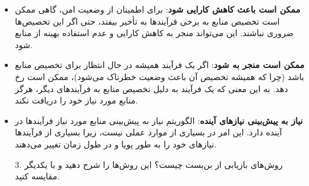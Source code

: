 \begin{qsolve}
\begin{enumerate}
\begin{itemize}
			\item \textbf{ممکن است باعث کاهش کارایی شود}: برای اطمینان از وضعیت امن، گاهی ممکن است تخصیص منابع به برخی فرآیندها به تأخیر بیفتد، حتی اگر این تخصیص‌ها ضروری نباشند. این می‌تواند منجر به کاهش کارایی و عدم استفاده بهینه از منابع شود.
			
			\item \textbf{ممکن است منجر به  شود}: اگر یک فرآیند همیشه در حال انتظار برای تخصیص منابع باشد (چرا که همیشه تخصیص آن باعث وضعیت خطرناک می‌شود)، ممکن است  رخ دهد. به این معنی که یک فرآیند به دلیل تخصیص منابع به فرآیندهای دیگر، هرگز منابع مورد نیاز خود را دریافت نکند.
			
			\item \textbf{نیاز به پیش‌بینی نیازهای آینده}: الگوریتم  نیاز به پیش‌بینی منابع مورد نیاز فرآیندها در آینده دارد. این امر در بسیاری از موارد عملی نیست، زیرا بسیاری از فرآیندها نیازهای خود را به طور پویا و در طول زمان تغییر می‌دهند.
		\end{itemize}
	\end{enumerate}
\end{qsolve}


\begin{enumerate}
	\item [3. ]
	روش‌های بازیابی از بن‌بست چیست؟ این روش‌ها را شرح دهید و با یکدیگر مقایسه کنید.
\end{enumerate}
\newpage

